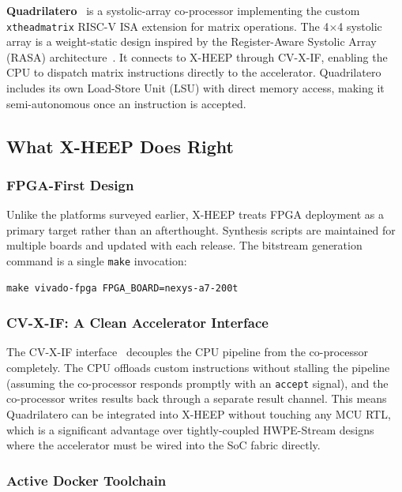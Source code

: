 \documentclass[journal]{IEEEtran}
\begin{document}
\textbf{Quadrilatero}~\cite{quadrilatero2021} is a systolic-array
co-processor implementing the custom \texttt{xtheadmatrix} RISC-V ISA
extension for matrix operations. The 4$\times$4 systolic array is a
weight-static design inspired by the Register-Aware Systolic Array (RASA)
architecture~\cite{rasa2021}. It connects to X-HEEP through CV-X-IF,
enabling the CPU to dispatch matrix instructions directly to the
accelerator. Quadrilatero includes its own Load-Store Unit (LSU) with
direct memory access, making it semi-autonomous once an instruction is
accepted.

\subsection{What X-HEEP Does Right}

\subsubsection{FPGA-First Design}

Unlike the platforms surveyed earlier, X-HEEP treats FPGA deployment as a
primary target rather than an afterthought. Synthesis scripts are maintained
for multiple boards and updated with each release. The bitstream generation
command is a single \texttt{make} invocation:

\begin{lstlisting}
make vivado-fpga FPGA_BOARD=nexys-a7-200t
\end{lstlisting}

\subsubsection{CV-X-IF: A Clean Accelerator Interface}

The CV-X-IF interface~\cite{cvxif_spec} decouples the CPU pipeline from the
co-processor completely. The CPU offloads custom instructions without stalling
the pipeline (assuming the co-processor responds promptly with an
\texttt{accept} signal), and the co-processor writes results back through a
separate result channel. This means Quadrilatero can be integrated into
X-HEEP without touching any MCU RTL, which is a significant advantage over
tightly-coupled HWPE-Stream designs where the accelerator must be wired into
the SoC fabric directly.

\subsubsection{Active Docker Toolchain}
\end{document}

